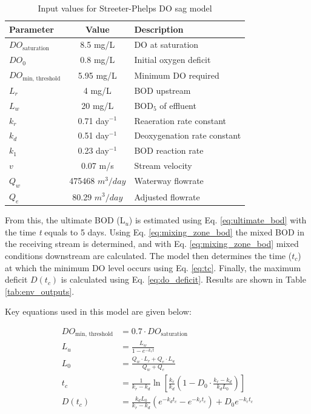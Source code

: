 \documentclass[12pt]{article}
\begin{document}
\begin{table}[h]
  \centering
  \caption{Input values for Streeter-Phelps DO sag model}
  \label{tab:env_inputs}
  \begin{tabular}{|l|c|l|}
  \hline
  \textbf{Parameter} & \textbf{Value} & \textbf{Description} \\
  \hline
  $DO_{\text{saturation}}$ & 8.5 mg/L & DO at saturation \\
  $DO_0$ & 0.8 mg/L & Initial oxygen deficit \\
  $DO_{\text{min, threshold}}$ & 5.95 mg/L & Minimum DO required \\
  $L_r$ & 4 mg/L & BOD upstream \\
  $L_w$ & 20 mg/L & BOD$_5$ of effluent \\
  $k_r$ & 0.71 day$^{-1}$ & Reaeration rate constant \\
  $k_d$ & 0.51 day$^{-1}$ & Deoxygenation rate constant \\
  $k_1$ & 0.23 day$^{-1}$ & BOD reaction rate \\
  $v$ & 0.07 m/s & Stream velocity \\
  $Q_w$ & 475468 $m^3/day$ & Waterway flowrate\\
  $Q_e$ &
80.29
  $m^3/day$ & Adjusted flowrate\\
  \hline
  \end{tabular}
\end{table}


From this, the ultimate BOD (L$_u$) is estimated using Eq. \eqref{eq:ultimate_bod} with the time \textit{t} 
equals to 5 days. Using Eq. \eqref{eq:mixing_zone_bod} the mixed BOD in the receiving stream is
determined, and with Eq. \eqref{eq:mixing_zone_bod} mixed conditions downstream are calculated.
The model then determines the time ($t_c$) at which the minimum DO level occurs using Eq. \eqref{eq:tc}. 
Finally, the maximum deficit $D(t_c)$ is calculated using Eq. \eqref{eq:do_deficit}. Results are 
shown in Table \ref{tab:env_outputs}.



Key equations used in this model are given below:

\begin{align}
DO_{\text{min, threshold}} &= 0.7 \cdot DO_{\text{saturation}} \label{eq:do_threshold} \\
L_u &= \frac{L_w}{1 - e^{-k_1 t}} \label{eq:ultimate_bod} \\
L_0 &= \frac{Q_w \cdot L_r + Q_e \cdot L_u}{Q_w + Q_e} \label{eq:mixing_zone_bod} \\
t_c &= \frac{1}{k_r - k_d} \ln \left[ \frac{k_r}{k_d} \left(1 - D_0 \cdot \frac{k_r - k_d}{k_d L_0} \right) \right] \label{eq:tc} \\
D(t_c) &= \frac{k_d L_0}{k_r - k_d} \left(e^{-k_d t_c} - e^{-k_r t_c}\right) + D_0 e^{-k_r t_c} \label{eq:do_deficit}
\end{align}
\end{document}
